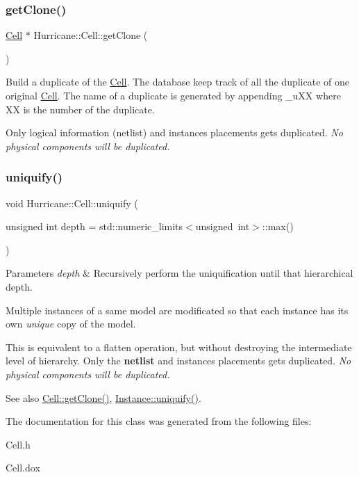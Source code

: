\subsubsection{\texorpdfstring{get\+Clone()}{getClone()}}
{\footnotesize\ttfamily \mbox{\hyperlink{classHurricane_1_1Cell}{Cell}} $\ast$ Hurricane\+::\+Cell\+::get\+Clone (\begin{DoxyParamCaption}{ }\end{DoxyParamCaption})}

Build a duplicate of the \mbox{\hyperlink{classHurricane_1_1Cell}{Cell}}. The database keep track of all the duplicate of one original \mbox{\hyperlink{classHurricane_1_1Cell}{Cell}}. The name of a duplicate is generated by appending {\ttfamily \textquotesingle{}\+\_\+u\+XX\textquotesingle{}} where {\ttfamily \textquotesingle{}XX\textquotesingle{}} is the number of the duplicate.

Only logical information (netlist) and instance\textquotesingle{}s placements gets duplicated. {\itshape No physical components will be duplicated.} \mbox{\label{classHurricane_1_1Cell_aa113c121813342b6304f3e7fddbc8565}} 
\subsubsection{\texorpdfstring{uniquify()}{uniquify()}}
{\footnotesize\ttfamily void Hurricane\+::\+Cell\+::uniquify (\begin{DoxyParamCaption}\item[{unsigned int}]{depth = {\ttfamily std\+:\+:numeric\+\_\+limits$<$unsigned~int$>$\+:\+:max()} }\end{DoxyParamCaption})}


\begin{DoxyParams}{Parameters}
{\em depth} & Recursively perform the uniquification until that hierarchical depth.\\
\hline
\end{DoxyParams}
Multiple instances of a same model are modificated so that each instance has it\textquotesingle{}s own {\itshape unique} copy of the model.

This is equivalent to a flatten operation, but without destroying the intermediate level of hierarchy. Only the {\bfseries netlist} and instance\textquotesingle{}s placements gets duplicated. {\itshape No physical components will be duplicated.}

\begin{DoxySeeAlso}{See also}
\mbox{\hyperlink{classHurricane_1_1Cell_a092f53c7f517ecc70d9ba375296c5d5b}{Cell\+::get\+Clone()}}, \mbox{\hyperlink{classHurricane_1_1Instance_adf28fcd01f6ff89c5435e83482f66d4c}{Instance\+::uniquify()}}. 
\end{DoxySeeAlso}


The documentation for this class was generated from the following files\+:\begin{DoxyCompactItemize}
\item 
Cell.\+h\item 
Cell.\+dox\end{DoxyCompactItemize}
